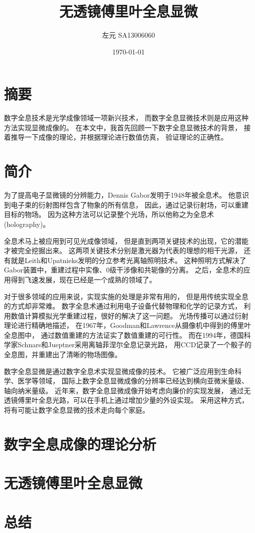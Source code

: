 \documentclass[11pt,a4paper]{article}
\title{无透镜傅里叶全息显微}
\author{左元 SA13006060}
\date{\today}
\begin{document}
\maketitle

\section{摘要}
数字全息技术是光学成像领域一项新兴技术，
而数字全息显微技术则是应用这种方法实现显微成像的。
在本文中，我首先回顾一下数字全息显微技术的背景，
接着推导一下成像的理论，并根据理论进行数值仿真，
验证理论的正确性。

\section{简介}
为了提高电子显微镜的分辨能力，Dennis Gabor发明于1948年被全息术。
他意识到电子束的衍射图样包含了物象的所有信息，
因此，通过记录衍射场，可以重建目标的物场。
因为这种方法可以记录整个光场，所以他称之为全息术(holography)\cite{gabor1948new, kim2010principles}。

全息术马上被应用到可见光成像领域，
但是直到两项关键技术的出现，它的潜能才被完全挖掘出来。
这两项关键技术分别是激光器为代表的理想的相干光源，
还有就是Leith和Upatnieks发明的分立参考光离轴照明技术\cite{leith1962reconstructed}。
这种照明方式解决了Gabor装置中，重建过程中实像、0级干涉像和共轭像的分离。
之后，全息术的应用得到飞速发展，现在已经是一个成熟的领域了。

对于很多领域的应用来说，实现实施的处理是非常有用的，
但是用传统实现全息的方式却非常难。
数字全息术通过利用电子设备代替物理和化学的记录方式，
利用数值计算模拟光学重建过程，很好的解决了这一问题。
光场传播可以通过衍射理论进行精确地描述，
在1967年，Goodman和Lawrence从摄像机中得到的傅里叶全息图中，
通过数值重建的方法证实了数值重建的可行性\cite{goodman1967digital}。
而在1994年，德国科学家Schnars和Jueptner采用离轴菲涅尔全息记录光路，
用CCD记录了一个骰子的全息图，并重建出了清晰的物场图像\cite{schnars1994direct}。

数字全息显微是通过数字全息术实现显微成像的技术。
它被广泛应用到生命科学、医学等领域，
国际上数字全息显微成像的分辨率已经达到横向亚微米量级、轴向纳米量级\cite{kemper2008digital,marquet2005digital,mann2006quantitative}。
近年来，数字全息显微成像开始考虑向廉价的实现发展，
通过无透镜傅里叶全息光路，可以在手机上通过增加少量的外设实现\cite{breslauer2009mobile,tseng2010lensfree,vashist2014cellphone}。
采用这种方式，将有可能让数字全息显微的技术走向每个家庭。

\section{数字全息成像的理论分析}


\section{无透镜傅里叶全息显微}

\section{总结}




\end{document}
